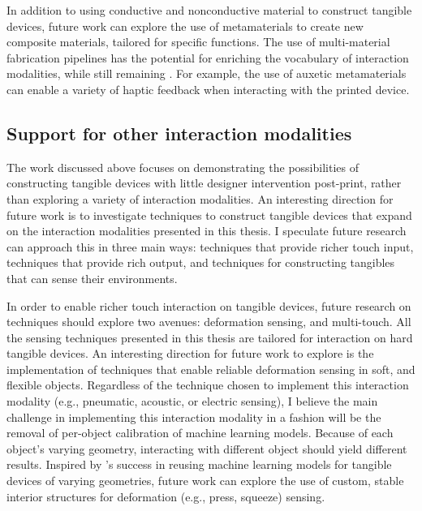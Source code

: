       In addition to using conductive and nonconductive material to construct
      tangible devices, future work can explore the use of metamaterials to
      create new composite materials, tailored for specific functions.  The use
      of multi-material fabrication pipelines has the potential for enriching
      the vocabulary of interaction modalities, while still remaining \pap.  For
      example, the use of auxetic metamaterials can enable a variety of haptic
      feedback when interacting with the printed device.

    \subsection{Support for other interaction modalities}
      The work discussed above focuses on demonstrating the possibilities of
      constructing tangible devices with little designer intervention
      post-print, rather than exploring a variety of interaction modalities. An
      interesting direction for future work is to investigate \papf techniques
      to construct tangible devices that expand on the interaction modalities
      presented in this thesis. I speculate future research can approach this in
      three main ways: techniques that provide richer touch input, techniques
      that provide rich output, and techniques for constructing tangibles that
      can sense their environments.

      In order to enable richer touch interaction on tangible devices, future
      research on \papf techniques should explore two avenues: deformation sensing,
      and multi-touch. All the sensing techniques presented in this thesis are
      tailored for interaction on hard tangible devices. An interesting
      direction for future work to explore is the implementation of \pap
      techniques that enable reliable deformation sensing in soft, and flexible
      objects.  Regardless of the technique chosen to implement this interaction
      modality (e.g., pneumatic, acoustic, or electric sensing), I believe the
      main challenge in implementing this interaction modality in a \pap fashion
      will be the removal of per-object calibration of machine learning models.
      Because of each object's varying geometry, interacting with different
      object should yield different results. Inspired by \at's success in
      reusing machine learning models for tangible devices of varying
      geometries, future work can explore the use of custom, stable interior
      structures for deformation (e.g., press, squeeze) sensing.

